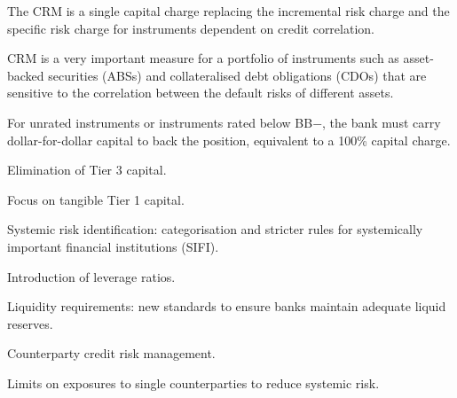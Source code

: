 

\begin{lettered}
\item The CRM is a single capital charge replacing the incremental risk charge and
the specific risk charge for instruments dependent on credit correlation.
\item CRM is a very important measure for a portfolio of instruments such as
asset-backed securities (ABSs) and collateralised debt obligations (CDOs) that are
sensitive to the correlation between the default risks of different assets.
\item For unrated instruments or instruments rated below BB$-$, the bank must carry
dollar-for-dollar capital to back the position, equivalent to a 100\% capital
charge.
\end{lettered}



\begin{lettered}
\item Elimination of Tier 3 capital.
\item Focus on tangible Tier 1 capital.
\item Systemic risk identification: categorisation and stricter rules for
systemically important financial institutions (SIFI).
\item Introduction of leverage ratios.
\item Liquidity requirements: new standards to ensure banks maintain adequate
liquid reserves.
\item Counterparty credit risk management.
\item Limits on exposures to single counterparties to reduce systemic risk.
\end{lettered}

